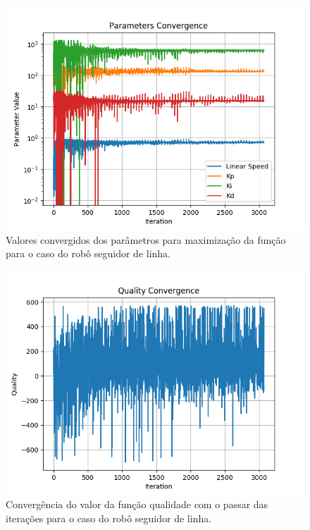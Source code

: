 \documentclass[conference]{IEEEtran}
\begin{document}
\begin{figure}[htbp]
\centering
\centerline{\includegraphics[scale=0.4]{line_parameters_convergence.png}}
\caption{Valores convergidos dos parâmetros para maximização da função para o caso do robô seguidor de linha.}
\label{line_parameters_convergence}
\end{figure}

\begin{figure}[htbp]
\centering
\centerline{\includegraphics[scale=0.4]{line_quality_convergence.png}}
\caption{Convergência do valor da função qualidade com o passar das iterações para o caso do robô seguidor de linha.}
\label{line_quality_convergence}
\end{figure}
\end{document}

